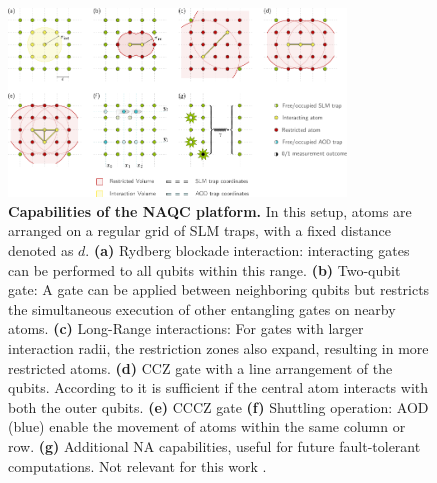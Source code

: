 \begin{figure}[htbp]
  \centering
    \includegraphics[width=0.8\textwidth]{figures/NeutralAtomFeatures.pdf}
    \caption{\textbf{Capabilities of the NAQC platform.} In this setup, atoms are arranged on a regular grid of \ac{SLM} traps, with a fixed distance denoted as $d$.
  \textbf{(a)} Rydberg blockade interaction: interacting gates can be performed to all qubits within this range.
  \textbf{(b)} Two-qubit gate: A gate can be applied between neighboring qubits but restricts the simultaneous execution of other entangling gates on nearby atoms.
   \textbf{(c)} Long-Range interactions: For gates with larger interaction radii, the restriction zones also expand, resulting in more restricted atoms.
  \textbf{(d)} CCZ gate with a line arrangement of the qubits. 
  According to \cite{Levine_2019} it is sufficient if the central atom interacts with both the outer qubits.
  \textbf{(e)} CCCZ gate 
  \textbf{(f)} Shuttling operation: \ac{AOD} (blue) enable the movement of atoms within the same column or row.
  \textbf{(g)} Additional NA capabilities, useful for future fault-tolerant computations. Not relevant for this work
   \parencite{Schmid_2024_NeutralAtomBasics}.
}\label{fig:NeutralAtomFeatures}
\end{figure}
